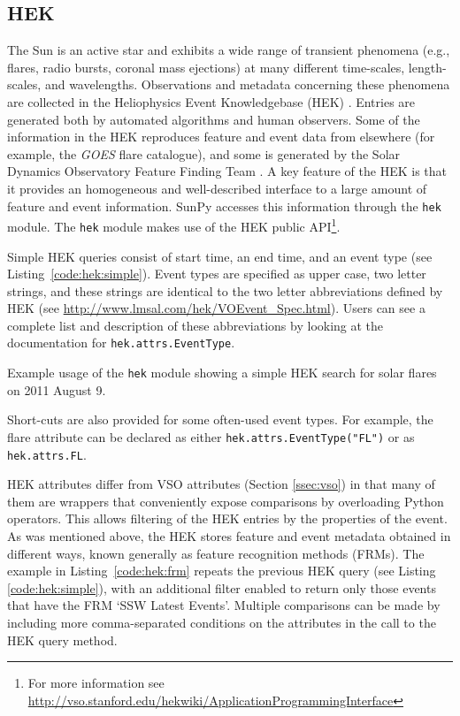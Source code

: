 \subsection{HEK}\label{ssec:hek}

The Sun is an active star and exhibits a wide range of transient phenomena 
(e.g., flares, radio bursts, coronal mass ejections) at many different time-scales, 
length-scales, and 
wavelengths. Observations and metadata concerning these phenomena are collected 
in the Heliophysics Event Knowledgebase (HEK) \citep{hurlburt2012}.  Entries are generated both by
automated algorithms and human observers.  Some of the information in the HEK 
reproduces feature and event data from elsewhere (for example, the \textit{GOES} flare catalogue),
and some is generated by the Solar Dynamics Observatory Feature Finding Team 
\citep{martens2012}.  A key feature of the HEK is that it
provides an homogeneous and well-described interface to a large amount of 
feature and event information. SunPy 
accesses this information through the \texttt{hek} module.  The \texttt{hek} module makes use of the 
HEK public API\footnote{For more information see \url{http://vso.stanford.edu/hekwiki/ApplicationProgrammingInterface}}.

Simple HEK queries consist of start time, an end time, and an event type 
(see Listing~\ref{code:hek:simple}). Event types are specified as upper case, 
two letter strings, and these strings are 
identical to the two letter abbreviations defined by HEK 
(see \url{http://www.lmsal.com/hek/VOEvent_Spec.html}). Users can see a
complete list and description of these abbreviations by looking at the documentation
for \texttt{hek.attrs.EventType}.

\begin{listing}[H]
\caption{Example usage of the \texttt{hek} module showing a simple HEK search for solar flares
on 2011 August 9.}
\label{code:hek:simple}
\end{listing}

Short-cuts are also provided for some often-used event types. For example, 
the flare attribute can be declared as either 
\texttt{hek.attrs.EventType("FL")} or as \texttt{hek.attrs.FL}. 

HEK attributes differ from VSO attributes (Section \ref{ssec:vso}) in that many 
of them are wrappers that conveniently expose comparisons by overloading Python 
operators. This allows filtering of the HEK entries by the properties of the 
event. As was mentioned above, the HEK stores feature and event metadata obtained 
in different ways, known generally as feature recognition methods (FRMs). 
The example in Listing~\ref{code:hek:frm} repeats the previous 
HEK query (see Listing \ref{code:hek:simple}), with an additional filter enabled 
to return only those events that have the FRM `SSW Latest Events'.  
Multiple comparisons can be made by including more comma-separated
conditions on the attributes in the call to the HEK query method.

